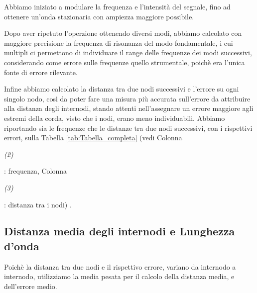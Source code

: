 \documentclass[12pt, a4paper]{article}
\begin{document}
Abbiamo iniziato a modulare la frequenza e l'intensità del segnale, fino ad ottenere un'onda stazionaria con ampiezza maggiore possibile.\

Dopo aver ripetuto l'operzione ottenendo diversi modi, abbiamo calcolato con maggiore precisione la frequenza di risonanza del modo fondamentale, i cui multipli ci permettono di individuare il range delle frequenze dei modi successivi, considerando come errore sulle frequenze quello strumentale, poichè era l'unica fonte di errore rilevante.\
 
Infine abbiamo calcolato la distanza tra due nodi successivi e l'errore su ogni singolo nodo, così da poter fare una misura più accurata sull'errore da attribuire alla distanza degli internodi, stando attenti nell'assegnare un errore maggiore agli estremi della corda, visto che i nodi, erano meno individuabili. Abbiamo riportando sia le frequenze che le distanze tra due nodi successivi, con i rispettivi errori, sulla Tabella \ref{tab:Tabella_completa} (vedi Colonna \begin{footnotesize}{\textit{(2)}}\end{footnotesize}: frequenza, Colonna \begin{footnotesize}{\textit{(3)}}\end{footnotesize}: distanza tra i nodi) .\


\subsection{Distanza media degli internodi e Lunghezza d'onda}
Poichè la distanza tra due nodi e il rispettivo errore, variano da internodo a internodo, utilizziamo la media pesata per il calcolo della distanza media, e dell'errore medio.\ 
\end{document}
